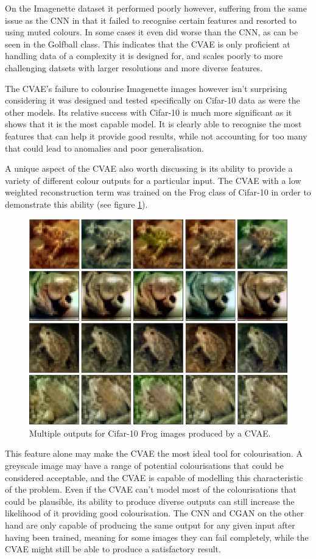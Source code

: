 \documentclass{l4proj}
\begin{document}
On the Imagenette dataset it performed poorly however, suffering from the same issue as the CNN in that it failed to recognise certain features and resorted to using muted colours. In some cases it even did worse than the CNN, as can be seen in the Golfball class. This indicates that the CVAE is only proficient at handling data of a complexity it is designed for, and scales poorly to more challenging datsets with larger resolutions and more diverse features.

The CVAE's failure to colourise Imagenette images however isn't surprising considering it was designed and tested specifically on Cifar-10 data as were the other models. Its relative success with Cifar-10 is much more significant as it shows that it is the most capable model. It is clearly able to recognise the most features that can help it provide good results, while not accounting for too many that could lead to anomalies and poor generalisation.

A unique aspect of the CVAE also worth discussing is its ability to provide a variety of different colour outputs for a particular input. The CVAE with a low weighted reconstruction term was trained on the Frog class of Cifar-10 in order to demonstrate this ability (see figure \ref{fig:diverseeval}). 

\begin{figure}[H]
    \centering
    \includegraphics[width=0.7\linewidth]{images/DiverseEval.png}    
    \caption{Multiple outputs for Cifar-10 Frog images produced by a CVAE.}

    \label{fig:diverseeval} 
\end{figure}

This feature alone may make the CVAE the most ideal tool for colourisation. A greyscale image may have a range of potential colourisations that could be considered acceptable, and the CVAE is capable of modelling this characteristic of the problem. Even if the CVAE can't model most of the colourisations that could be plausible, its ability to produce diverse outputs can still increase the likelihood of it providing good colourisation. The CNN and CGAN on the other hand are only capable of producing the same output for any given input after having been trained, meaning for some images they can fail completely, while the CVAE might still be able to produce a satisfactory result.
\end{document}
